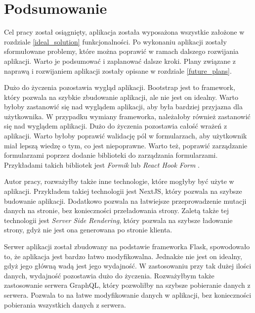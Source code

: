 \section{Podsumowanie}\label{summary}
Cel pracy został osiągnięty, aplikacja została wyposażona wszystkie założone w rozdziale \ref{ideal_solution} funkcjonalności. Po wykonaniu aplikacji zostały sformułowane problemy, które można poprawić w ramach dalszego rozwijania aplikacji. Warto je podsumować i zaplanować dalsze kroki. Plany związane z naprawą i rozwijaniem aplikacji zostały opisane w rozdziale \ref{future_plans}.

Dużo do życzenia pozostawia wygląd aplikacji. Bootstrap jest to framework, który pozwala na szybkie zbudowanie aplikacji, ale nie jest on idealny. Warto byłoby zastanowić się nad wyglądem aplikacji, aby była bardziej przyjazna dla użytkownika. W przypadku wymiany frameworka, należałoby również zastanowić się nad wyglądem aplikacji. Dużo do życzenia pozostawia całość wrażeń z aplikacji. Warto byłoby poprawić walidację pól w formularzach, aby użytkownik miał lepszą wiedzę o tym, co jest niepoprawne. Warto też, poprawić zarządzanie formularzami poprzez dodanie biblioteki do zarządzania formularzami. Przykładami takich bibliotek jest \textit{Formik} \cite{Formik} lub \textit{React Hook Form} \cite{React_hook_form}.

Autor pracy, rozważyłby także inne technologie, które mogłyby być użyte w aplikacji. Przykładem takiej technologii jest NextJS, który pozwala na szybsze budowanie aplikacji. Dodatkowo pozwala na łatwiejsze przeprowadzenie mutacji danych na stronie, bez konieczności przeładowania strony. Zaletą także tej technologii jest \textit{Server Side Rendering}, który pozwala na szybsze ładowanie strony, gdyż nie jest ona generowana po stronie klienta.

Serwer aplikacji został zbudowany na podstawie frameworka Flask, spowodowało to, że aplikacja jest bardzo łatwo modyfikowalna. Jednakże nie jest on idealny, gdyż jego główną wadą jest jego wydajność. W zastosowaniu przy tak dużej ilości danych, wydajność pozostawia dużo do życzenia. Rozważyłbym także zastosowanie serwera GraphQL, który pozwoliłby na szybsze pobieranie danych z serwera. Pozwala to na łatwe modyfikowanie danych w aplikacji, bez konieczności pobierania wszystkich danych z serwera.


